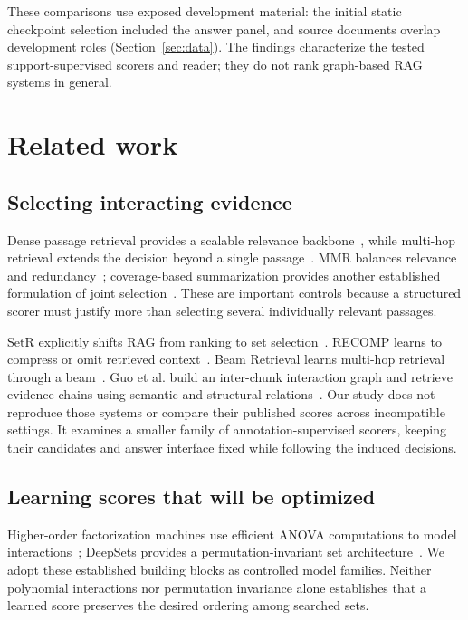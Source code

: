 \documentclass[preprint,12pt]{elsarticle}
\begin{document}
These comparisons use exposed development material: the initial static checkpoint selection included the answer panel, and source documents overlap development roles (Section~\ref{sec:data}). The findings characterize the tested support-supervised scorers and reader; they do not rank graph-based RAG systems in general.

\section{Related work}
\subsection{Selecting interacting evidence}
Dense passage retrieval provides a scalable relevance backbone~\cite{karpukhin2020dpr}, while multi-hop retrieval extends the decision beyond a single passage~\cite{xiong2021mdr}. MMR balances relevance and redundancy~\cite{carbonell1998mmr}; coverage-based summarization provides another established formulation of joint selection~\cite{lin2011submodular}. These are important controls because a structured scorer must justify more than selecting several individually relevant passages.

SetR explicitly shifts RAG from ranking to set selection~\cite{lee2025setr}. RECOMP learns to compress or omit retrieved context~\cite{xu2024recomp}. Beam Retrieval learns multi-hop retrieval through a beam~\cite{zhang2024beam}. Guo et al. build an inter-chunk interaction graph and retrieve evidence chains using semantic and structural relations~\cite{guo2025interchunk}. Our study does not reproduce those systems or compare their published scores across incompatible settings. It examines a smaller family of annotation-supervised scorers, keeping their candidates and answer interface fixed while following the induced decisions.

\subsection{Learning scores that will be optimized}
Higher-order factorization machines use efficient ANOVA computations to model interactions~\cite{blondel2016hofm}; DeepSets provides a permutation-invariant set architecture~\cite{zaheer2017deepsets}. We adopt these established building blocks as controlled model families. Neither polynomial interactions nor permutation invariance alone establishes that a learned score preserves the desired ordering among searched sets.
\end{document}
